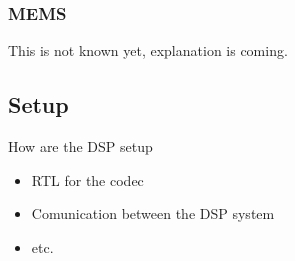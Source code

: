 \subsubsection*{MEMS}

This is not known yet, explanation is coming.
%



\subsection{Setup}\label{subsec:SetupOfDSP}


How are the DSP setup

\begin{itemize}
	\item RTL for the codec
	\item Comunication between the DSP system
	\item etc.
\end{itemize}




